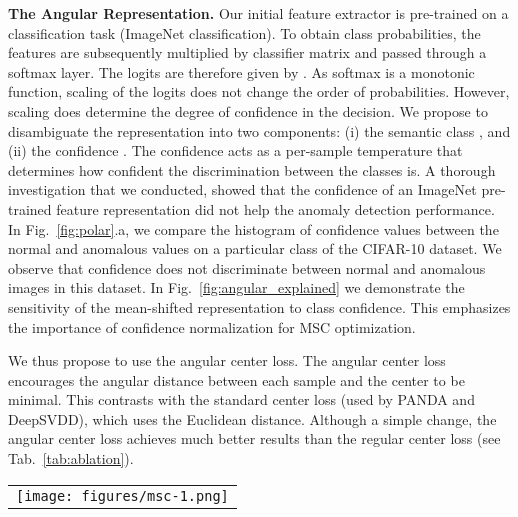 \documentclass[letterpaper]{article} \usepackage{aaai23}  \usepackage{times}  \usepackage{helvet}  \usepackage{courier}  \usepackage[hyphens]{url}  \usepackage{graphicx} \usepackage{amsmath, amssymb}
\begin{document}
\textbf{The Angular Representation.} Our initial feature extractor  is pre-trained on a classification task (ImageNet classification). To obtain class probabilities, the features  are subsequently multiplied by classifier matrix  and passed through a softmax layer. The logits are therefore given by . As softmax is a monotonic function, scaling of the logits does not change the order of probabilities. However, scaling does determine the degree of confidence in the decision. We propose to disambiguate the representation  into two components: (i) the semantic class , and (ii) the confidence . The confidence acts as a per-sample temperature that determines how confident the discrimination between the classes is. A thorough investigation that we conducted, showed that the confidence of an ImageNet pre-trained feature representation did not help the anomaly detection performance. In Fig.~\ref{fig:polar}.a, we compare the histogram of confidence values between the normal and anomalous values on a particular class of the CIFAR-10 dataset. We observe that confidence does not discriminate between normal and anomalous images in this dataset. In Fig.~\ref{fig:angular_explained} we demonstrate the sensitivity of the mean-shifted representation to class confidence. This emphasizes the importance of confidence normalization for MSC optimization.

We thus propose to use the angular center loss. The angular center loss encourages the angular distance between each sample and the center to be minimal. This contrasts with the standard center loss (used by PANDA and DeepSVDD), which uses the Euclidean distance. Although a simple change, the angular center loss achieves much better results than the regular center loss (see Tab.~\ref{tab:ablation}).


\begin{figure*}[t]
  \centering
    \begin{tabular}{c}
    \texttt{[image: figures/msc-1.png]} 
    \end{tabular}
    \caption{Sensitivity of  to class confidence. \textit{(a)} The angular representation in relation to the origin without confidence normalization. \textit{(b)} The mean-shifted representation enlarges the angle between the positive samples. \textit{(c)} The angular representation after confidence normalization. \textit{(d)} The angle between the positive samples is  approximately preserved after mean-shifting.} \label{fig:angular_explained}
\end{figure*}
\end{document}
